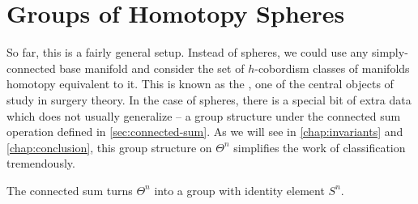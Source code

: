 \pagebreak
\section{Groups of Homotopy Spheres}\label{sec:groups-of-homotopy-spheres}

So far, this is a fairly general setup. Instead of spheres, we could use any simply-connected base manifold and consider the set of $h$-cobordism classes of manifolds homotopy equivalent to it. This is known as the , one of the central objects of study in surgery theory. In the case of spheres, there is a special bit of extra data which does not usually generalize -- a group structure under the connected sum operation defined in \cref{sec:connected-sum}. 
As we will see in \cref{chap:invariants} and \cref{chap:conclusion}, this group structure on $\Theta^n$ simplifies the work of classification tremendously.

\begin{theorem}\label{thm:group-of-homotopy-spheres}
	The connected sum turns $\Theta^n$ into a group with identity element $S^n$.
\end{theorem}

